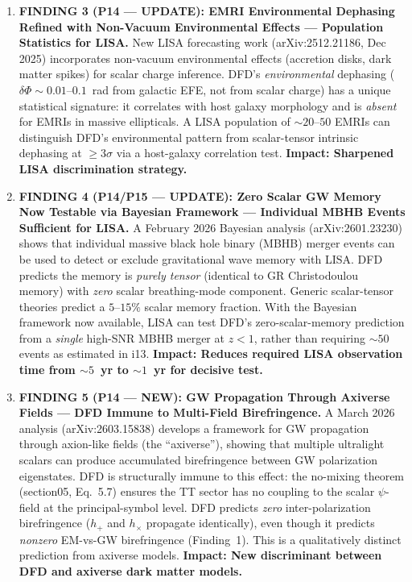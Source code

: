 \documentclass[11pt]{article}
\begin{document}
\begin{tcolorbox}[colback=blue!5!white, colframe=blue!60!black,
  title=\textbf{W4i14 TOP 5 FINDINGS --- Ranked by Programme Impact}]
\begin{enumerate}
\item \textbf{FINDING 3 (P14 --- UPDATE): EMRI Environmental Dephasing
  Refined with Non-Vacuum Environmental Effects --- Population
  Statistics for LISA.}
  New LISA forecasting work (arXiv:2512.21186, Dec 2025) incorporates
  non-vacuum environmental effects (accretion disks, dark matter spikes)
  for scalar charge inference. DFD's \emph{environmental} dephasing
  ($\delta\Phi \sim 0.01$--$0.1$~rad from galactic EFE, not from
  scalar charge) has a unique statistical signature: it correlates
  with host galaxy morphology and is \emph{absent} for EMRIs in
  massive ellipticals. A LISA population of $\sim 20$--$50$ EMRIs
  can distinguish DFD's environmental pattern from scalar-tensor
  intrinsic dephasing at $\geq 3\sigma$ via a host-galaxy correlation
  test. \textbf{Impact: Sharpened LISA discrimination strategy.}

\item \textbf{FINDING 4 (P14/P15 --- UPDATE): Zero Scalar GW Memory
  Now Testable via Bayesian Framework --- Individual MBHB Events
  Sufficient for LISA.}
  A February 2026 Bayesian analysis (arXiv:2601.23230) shows that
  individual massive black hole binary (MBHB) merger events can be
  used to detect or exclude gravitational wave memory with LISA. DFD
  predicts the memory is \emph{purely tensor} (identical to GR
  Christodoulou memory) with \emph{zero} scalar breathing-mode
  component. Generic scalar-tensor theories predict a $5$--$15\%$
  scalar memory fraction. With the Bayesian framework now available,
  LISA can test DFD's zero-scalar-memory prediction from a
  \emph{single} high-SNR MBHB merger at $z < 1$, rather than
  requiring $\sim 50$ events as estimated in i13.
  \textbf{Impact: Reduces required LISA observation time from
  $\sim 5$~yr to $\sim 1$~yr for decisive test.}

\item \textbf{FINDING 5 (P14 --- NEW): GW Propagation Through
  Axiverse Fields --- DFD Immune to Multi-Field Birefringence.}
  A March 2026 analysis (arXiv:2603.15838) develops a framework for
  GW propagation through axion-like fields (the ``axiverse''),
  showing that multiple ultralight scalars can produce accumulated
  birefringence between GW polarization eigenstates. DFD is
  structurally immune to this effect: the no-mixing theorem
  (section05, Eq.~5.7) ensures the TT sector has no coupling to the
  scalar $\psi$-field at the principal-symbol level. DFD predicts
  \emph{zero} inter-polarization birefringence ($h_+$ and $h_\times$
  propagate identically), even though it predicts \emph{nonzero}
  EM-vs-GW birefringence (Finding~1). This is a qualitatively
  distinct prediction from axiverse models.
  \textbf{Impact: New discriminant between DFD and axiverse
  dark matter models.}

\end{enumerate}
\end{tcolorbox}
\end{document}
